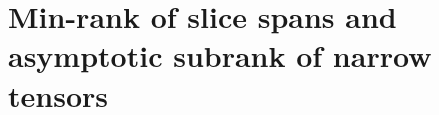 \section{Min-rank of slice spans and asymptotic subrank of narrow tensors} %
%
\label{sec:lower-bound-imbalanced}
